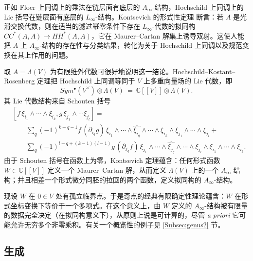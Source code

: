 \documentclass[11pt,a4paper]{article}
\numberwithin{equation}{section}
\newcommand{\bC}{\mathbb{C}}
\begin{document}
正如 Floer 上同调上的乘法在链层面有底层的 $A_{\infty}$-结构，Hochschild 上同调上的 Lie 括号在链层面有底层的 $L_{\infty}$-结构。Kontsevich 的形式性定理 \cite{Kontsevich:DefQuant} 断言：若 $A$ 是光滑交换代数，则在适当的滤过幂零条件下存在 $L_{\infty}$-代数的拟同构 $CC^*(A,A) \rightarrow HH^*(A,A)$，它在 Maurer--Cartan 解集上诱导双射。这使人能把 $A$ 上 $A_{\infty}$-结构的存在性与分类结果，转化为关于 Hochschild 上同调以及规范变换在其上作用的问题。

取 $A = \Lambda(V)$ 为有限维外代数可很好地说明这一结论。Hochschild--Kostant--Rosenberg 定理把 Hochschild 上同调等同于 $V$ 上多重向量场的 Lie 代数，即
\[
Sym^{\bullet}(V^{\vee}) \otimes \Lambda(V) \ = \ \bC[\![V]\!] \otimes \Lambda(V).
\]
其 Lie 代数结构来自 Schouten 括号
\begin{equation}
\begin{aligned} {}
& [f \,\xi_{i_1} \wedge \cdots \wedge \xi_{i_k}, g \,\xi_{j_1} \wedge \cdots \xi_{j_l}] = \\
& \textstyle \qquad \sum_q (-1)^{k-q-1} f \, (\partial_{i_q}g) \,
\xi_{i_1}  \wedge \cdots \wedge \widehat{\xi_{i_q}} \wedge \cdots
\wedge \xi_{i_k} \wedge \xi_{j_1} \wedge \cdots \wedge \xi_{j_l} + \\ & \textstyle \qquad
 \sum_q (-1)^{l-q+ (k-1)(l-1)} g \,(\partial_{j_q}f)\, \xi_{j_1} \wedge \cdots \wedge \widehat{\xi_{j_q}} \wedge \cdots \wedge \xi_{j_l} \wedge \xi_{i_1} \wedge
 \cdots \wedge \xi_{i_k}.
\end{aligned}
\end{equation}
由于 Schouten 括号在函数上为零，Kontsevich 定理蕴含：任何形式函数 $W\in\bC[\![V]\!]$ 定义一个 Maurer--Cartan 解，从而定义 $\Lambda(V)$ 上的一个 $A_{\infty}$-结构；并且相差一个形式微分同胚的拉回的两个函数，定义拟同构的 $A_{\infty}$-结构。

现设 $W$ 在 $0\in V$ 处有孤立临界点。于是奇点的经典有限确定性理论蕴含：$W$ 在形式坐标变换下等价于一个多项式。在这个意义上，由 $W$ 定义的 $A_{\infty}$-结构被有限量的数据完全决定（在拟同构意义下），从原则上说是可计算的，尽管 \emph{a priori} 它可能允许无穷多个非零乘积。有关一个概览性的例子见 \ref{Subsec:genus2} 节。

\subsection{生成\label{Sec:Generation}}
\end{document}
